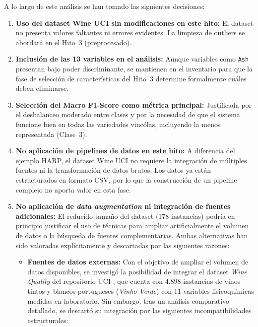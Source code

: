 A lo largo de este an\'alisis se han tomado las siguientes decisiones:

\begin{enumerate}
    \item \textbf{Uso del dataset Wine UCI sin modificaciones en este hito:} El
    dataset no presenta valores faltantes ni errores evidentes. La limpieza de
    outliers se abordar\'a en el Hito~3 (preprocesado).

    \item \textbf{Inclusi\'on de las 13 variables en el an\'alisis:} Aunque variables
    como \texttt{Ash} presentan bajo poder discriminante, se mantienen en el inventario
    para que la fase de selecci\'on de caracter\'isticas del Hito~3 determine
    formalmente cu\'ales deben eliminarse.

    \item \textbf{Selecci\'on del Macro F1-Score como m\'etrica principal:}
    Justificada por el desbalanceo moderado entre clases y por la necesidad de que el
    sistema funcione bien en todas las variedades vinc\'olas, incluyendo la menos
    representada (Clase~3).

    \item \textbf{No aplicaci\'on de pipelines de datos en este hito:} A diferencia
    del ejemplo HARP, el dataset Wine UCI no requiere la integraci\'on de m\'ultiples
    fuentes ni la transformaci\'on de datos brutos. Los datos ya est\'an estructurados
    en formato CSV, por lo que la construcci\'on de un pipeline complejo no aporta
    valor en esta fase.

    \item \textbf{No aplicaci\'on de \textit{data augmentation} ni integraci\'on
de fuentes adicionales:} El reducido tama\~no del dataset (178 instancias)
podr\'ia en principio justificar el uso de t\'ecnicas para ampliar
artificialmente el volumen de datos o la b\'usqueda de fuentes complementarias.
Ambas alternativas han sido valoradas expl\'icitamente y descartadas por las
siguientes razones:

\begin{itemize}
    \item \textbf{Fuentes de datos externas:} Con el objetivo de ampliar el
    volumen de datos disponibles, se investig\'o la posibilidad de integrar
    el dataset \textit{Wine Quality} del repositorio UCI \cite{CEB09}, que
    cuenta con 4.898 instancias de vinos tintos y blancos portugueses
    (\textit{Vinho Verde}) con 11 variables fisicoqu\'imicas medidas en
    laboratorio. Sin embargo, tras un an\'alisis comparativo detallado, se
    descart\'o su integraci\'on por las siguientes incompatibilidades
    estructurales:


\end{itemize}
\end{enumerate}
